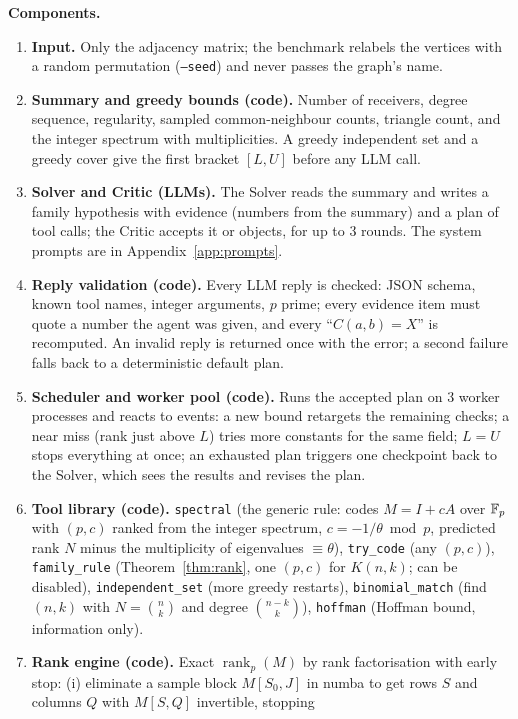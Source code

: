 \textbf{Components.}
\begin{enumerate}
  \item \textbf{Input.} Only the adjacency matrix; the benchmark relabels the vertices with a random permutation
  (\texttt{--seed}) and never passes the graph's name.
  \item \textbf{Summary and greedy bounds (code).} Number of receivers, degree sequence, regularity, sampled
  common-neighbour counts, triangle count, and the integer spectrum with multiplicities. A greedy independent set and
  a greedy cover give the first bracket $[L,U]$ before any LLM call.
  \item \textbf{Solver and Critic (LLMs).} The Solver reads the summary and writes a family hypothesis with evidence
  (numbers from the summary) and a plan of tool calls; the Critic accepts it or objects, for up to 3 rounds. The
  system prompts are in Appendix~\ref{app:prompts}.
  \item \textbf{Reply validation (code).} Every LLM reply is checked: JSON schema, known tool names, integer
  arguments, $p$ prime; every evidence item must quote a number the agent was given, and every ``$C(a,b)=X$'' is
  recomputed. An invalid reply is returned once with the error; a second failure falls back to a deterministic default
  plan.
  \item \textbf{Scheduler and worker pool (code).} Runs the accepted plan on 3 worker processes and reacts to
  events: a new bound retargets the remaining checks; a near miss (rank just above $L$) tries more constants for the
  same field; $L=U$ stops everything at once; an exhausted plan triggers one checkpoint back to the Solver, which sees
  the results and revises the plan.
  \item \textbf{Tool library (code).} \texttt{spectral} (the generic rule: codes $M=I+cA$ over $\mathbb{F}_p$ with $(p,c)$
  ranked from the integer spectrum, $c=-1/\theta \bmod p$, predicted rank $N$ minus the multiplicity of eigenvalues
  $\equiv\theta$), \texttt{try\_code} (any $(p,c)$), \texttt{family\_rule} (Theorem~\ref{thm:rank}, one $(p,c)$ for
  $K(n,k)$; can be disabled), \texttt{independent\_set} (more greedy restarts), \texttt{binomial\_match} (find
  $(n,k)$ with $N=\binom nk$ and degree $\binom{n-k}{k}$), \texttt{hoffman} (Hoffman bound, information only).
  \item \textbf{Rank engine (code).} Exact $\operatorname{rank}_p(M)$ by rank factorisation with early stop:
  (i) eliminate a sample block $M[S_0,J]$ in numba to get rows $S$ and columns $Q$ with $M[S,Q]$ invertible, stopping

\end{enumerate}
